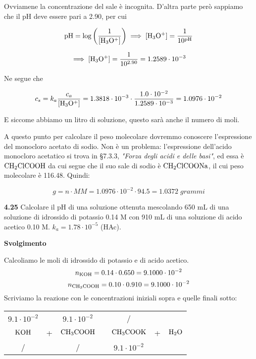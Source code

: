 Ovviamene la concentrazione del sale è incognita. D'altra parte però sappiamo che il pH deve essere pari a 2.90, per cui 

$$\rm pH=\log{\left(\frac{1}{[H_3O^+]}\right)}
\implies
[H_3O^+]=\frac{1}{10^{pH}}$$

$$\implies
\rm [H_3O^+]=\frac{1}{10^{2.90}}
=1.2589 \cdot 10^{-3}$$

Ne segue che

$$c_s=k_a\frac{c_a}{\rm [H_3O^+]}
=1.3818 \cdot 10^{-3} \cdot \frac{1.0 \cdot 10^{-2}}{1.2589 \cdot 10^{-3}}
=1.0976 \cdot 10^{-2}$$

E siccome abbiamo un litro di soluzione, questo sarà anche il numero di moli.

A questo punto per calcolare il peso molecolare dovremmo conoscere l'espressione del monocloro acetato di sodio. Non è un problema: l'espressione dell'acido monocloro acetatico si trova in §7.3.3, \textit{"Forza degli acidi e delle basi"}, ed essa è $\rm CH_2ClCOOH$ da cui segue che il suo sale di sodio è $\rm CH_2ClCOONa$, il cui peso molecolare è 116.48. Quindi:

$$g=n \cdot MM=1.0976 \cdot 10^{-2} \cdot 94.5=1.0372\;grammi$$

\vspace{0.2cm}\textbf{4.25} Calcolare il pH di una soluzione ottenuta mescolando 650 mL di una soluzione di idrossido di potassio 0.14 M con 910 mL di una soluzione di acido acetico 0.10 M. $k_a = 1.78 \cdot 10^{-5}$ (HAc).

\vspace{0.2cm}\large\textbf{Svolgimento}\normalsize

\vspace{0.2cm}Calcoliamo le moli di idrossido di potassio e di acido acetico.
$$n_{\rm KOH}=0.14\cdot 0.650 = 9.1000\cdot 10^{-2}$$
$$n_{\rm CH_3COOH}=0.10\cdot 0.910 = 9.1000\cdot 10^{-2}$$
Scriviamo la reazione con le concentrazioni iniziali sopra e quelle finali sotto:

\begin{center}
    \begin{tabular}{ccccccc}
        $9.1\cdot 10^{-2}$ &  & $9.1\cdot 10^{-2}$ & & / &&\\
        $\rm KOH$ & + & $\rm CH_3COOH$ & \ce{->} & $\rm CH_3COOK$ & + & $\rm H_2O$\\
        / &  &  / & & $9.1\cdot 10^{-2}$ &&\\
    \end{tabular}
\end{center}

